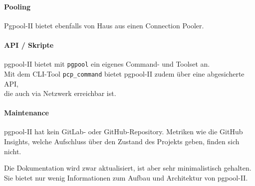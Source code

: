 \begin{flushleft}
    \paragraph{Pooling}
    Pgpool-II bietet ebenfalls von Haus aus einen \Gls{Connection Pooler}.
\end{flushleft}
\begin{flushleft}
    \paragraph{API / Skripte}
    pgpool-II bietet mit \texttt{pgpool} ein eigenes Command- und Toolset an.\\
    Mit dem CLI-Tool \texttt{pcp\_command} bietet pgpool-II zudem über eine abgesicherte API,\\
    die auch via Netzwerk erreichbar ist.
\end{flushleft}
\begin{flushleft}
    \paragraph{Maintenance}
    pgpool-II hat kein GitLab- oder GitHub-Repository.
    Metriken wie die GitHub Insights, welche Aufschluss über den Zustand des Projekts geben, finden sich nicht.
\end{flushleft}
\begin{flushleft}
    Die Dokumentation wird zwar aktualisiert, ist aber sehr minimalistisch gehalten.\\
    Sie bietet nur wenig Informationen zum Aufbau und Architektur von pgpool-II.
\end{flushleft}

